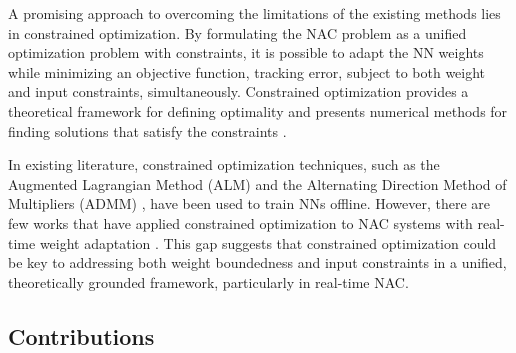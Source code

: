 \documentclass[letterpaper, journal]{IEEEtran}
\begin{document}

A promising approach to overcoming the limitations of the existing methods lies in constrained optimization.
By formulating the NAC problem as a unified optimization problem with constraints, it is possible to adapt the NN weights while minimizing an objective function, \eg tracking error, subject to both weight and input constraints, simultaneously.
Constrained optimization provides a theoretical framework for defining optimality and presents numerical methods for finding solutions that satisfy the constraints \cite{Nocedal:2006aa}.

In existing literature, constrained optimization techniques, such as the Augmented Lagrangian Method (ALM) \cite{Evens:2021aa} and the Alternating Direction Method of Multipliers (ADMM) \cite{Wang:2019aa,Taylor:2016aa}, have been used to train NNs offline. 
However, there are few works that have applied constrained optimization to NAC systems with real-time weight adaptation \cite{Ryu:2024aa,Ryu:2025aa}.
This gap suggests that constrained optimization could be key to addressing both weight boundedness and input constraints in a unified, theoretically grounded framework, particularly in real-time NAC.

\subsection{Contributions}
\end{document}

